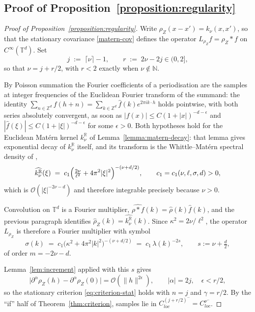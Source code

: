 \documentclass[pdflatex,sn-mathphys,Numbered]{sn-jnl}
\theoremstyle{thmstyleone}%
\theoremstyle{thmstyletwo}%
\theoremstyle{thmstylethree}%
\newcommand{\RR}{\mathbb{R}}
\newcommand{\ZZ}{\mathbb{Z}}
\newcommand{\NN}{\mathbb{N}}
\newcommand{\TT}{\mathbb{T}}
\newcommand{\calO}{\mathcal{O}}
\begin{document}
\begin{appendices}
\subsection{Proof of Proposition~\ref{proposition:regularity}}
\label{app:proof-regularity}

\begin{proof}[Proof of Proposition~\ref{proposition:regularity}]
Write $\rho_Z(x-x') = k_\nu(x,x')$, so that the stationary covariance
\eqref{matern-cov} defines the operator $L_{\rho_Z}f = \rho_Z \ast f$ on
$C^\infty(\TT^d)$. Set
\[
    j \;:=\; \lceil\nu\rceil-1 , \qquad r \;:=\; 2\nu-2j \in (0,2] ,
\]
so that $\nu = j + r/2$, with $r<2$ exactly when $\nu \notin \NN$.

By Poisson summation the Fourier coefficients of a periodisation are the samples
at integer frequencies of the Euclidean Fourier transform of the summand: the
identity $\sum_{n \in \ZZ^d} f(h+n) = \sum_{k \in \ZZ^d} \hat f(k)e^{2\pi i
k\cdot h}$ holds pointwise, with both series absolutely convergent, as soon as
$|f(x)| \leq C(1+|x|)^{-d-\epsilon}$ and $|\hat f(\xi)| \leq
C(1+|\xi|)^{-d-\epsilon}$ for some $\epsilon>0$. Both hypotheses hold for the
Euclidean Mat\'ern kernel $k^{\RR}_\nu$ of Lemma~\ref{lemma:matern-decay}: that
lemma gives exponential decay of $k^{\RR}_\nu$ itself, and its transform is the
Whittle--Mat\'ern spectral density of \cite{lindgren2011},
\begin{equation}\label{eq:whittle-matern}
    \widehat{k^{\RR}_\nu}(\xi)
    \;=\; c_1\Bigl(\tfrac{2\nu}{\ell^2} + 4\pi^2|\xi|^2\Bigr)^{-(\nu + d/2)},
    \qquad c_1 = c_1(\nu,\ell,\sigma,d) > 0 ,
\end{equation}
which is $\calO(|\xi|^{-2\nu-d})$ and therefore integrable precisely because
$\nu>0$.

Convolution on $\TT^d$ is a Fourier multiplier, $\widehat{\rho \ast f}(k) =
\hat\rho(k)\hat f(k)$, and
the previous paragraph identifies $\hat\rho_Z(k) = \widehat{k^{\RR}_\nu}(k)$.
Since $\kappa^2 = 2\nu/\ell^2$, the operator $L_{\rho_Z}$ is therefore a Fourier
multiplier with symbol
\begin{equation}\label{eq:correct-symbol}
    \sigma(k) \;=\; c_1\bigl(\kappa^2 + 4\pi^2|k|^2\bigr)^{-(\nu+d/2)}
    \;=\; c_1\,\lambda(k)^{-2s}, \qquad s := \nu + \tfrac d2 ,
\end{equation}
of order $m = -2\nu-d$.

Lemma~\ref{lem:increment} applied with this $s$ gives
\[
    \bigl|\partial^\alpha \rho_Z(h) - \partial^\alpha \rho_Z(0)\bigr| = \calO(\|h\|^{2\epsilon}),
    \qquad |\alpha| = 2j, \quad \epsilon < r/2 ,
\]
so the stationary criterion \eqref{eq:criterion-stat} holds with $n=j$ and
$\gamma = r/2$. By the ``if'' half of Theorem~\ref{thm:criterion}, samples
lie in $C^{(j+r/2)^-}_{loc} = C^{\nu^-}_{loc}$.


\end{proof}
\end{appendices}
\end{document}
